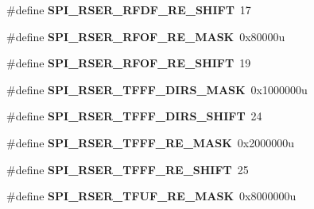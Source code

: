 \begin{DoxyCompactItemize}
\item 
\#define {\bfseries S\+P\+I\+\_\+\+R\+S\+E\+R\+\_\+\+R\+F\+D\+F\+\_\+\+R\+E\+\_\+\+S\+H\+I\+FT}~17\hypertarget{group__SPI__Register__Masks_ga39481cbcda158bbfc6640eb07d0c2276}{}\label{group__SPI__Register__Masks_ga39481cbcda158bbfc6640eb07d0c2276}

\item 
\#define {\bfseries S\+P\+I\+\_\+\+R\+S\+E\+R\+\_\+\+R\+F\+O\+F\+\_\+\+R\+E\+\_\+\+M\+A\+SK}~0x80000u\hypertarget{group__SPI__Register__Masks_ga32d8083bb571fb12a424b1803c596f47}{}\label{group__SPI__Register__Masks_ga32d8083bb571fb12a424b1803c596f47}

\item 
\#define {\bfseries S\+P\+I\+\_\+\+R\+S\+E\+R\+\_\+\+R\+F\+O\+F\+\_\+\+R\+E\+\_\+\+S\+H\+I\+FT}~19\hypertarget{group__SPI__Register__Masks_gab18f888cf02c471809ebc9f807711a13}{}\label{group__SPI__Register__Masks_gab18f888cf02c471809ebc9f807711a13}

\item 
\#define {\bfseries S\+P\+I\+\_\+\+R\+S\+E\+R\+\_\+\+T\+F\+F\+F\+\_\+\+D\+I\+R\+S\+\_\+\+M\+A\+SK}~0x1000000u\hypertarget{group__SPI__Register__Masks_ga01228112dcc4440aa1678eb55b97306e}{}\label{group__SPI__Register__Masks_ga01228112dcc4440aa1678eb55b97306e}

\item 
\#define {\bfseries S\+P\+I\+\_\+\+R\+S\+E\+R\+\_\+\+T\+F\+F\+F\+\_\+\+D\+I\+R\+S\+\_\+\+S\+H\+I\+FT}~24\hypertarget{group__SPI__Register__Masks_ga9f1684fdb2e7f9e9adb7afd07a3278da}{}\label{group__SPI__Register__Masks_ga9f1684fdb2e7f9e9adb7afd07a3278da}

\item 
\#define {\bfseries S\+P\+I\+\_\+\+R\+S\+E\+R\+\_\+\+T\+F\+F\+F\+\_\+\+R\+E\+\_\+\+M\+A\+SK}~0x2000000u\hypertarget{group__SPI__Register__Masks_ga1bb1c8b3d77e69e8ea3197b2a26392cb}{}\label{group__SPI__Register__Masks_ga1bb1c8b3d77e69e8ea3197b2a26392cb}

\item 
\#define {\bfseries S\+P\+I\+\_\+\+R\+S\+E\+R\+\_\+\+T\+F\+F\+F\+\_\+\+R\+E\+\_\+\+S\+H\+I\+FT}~25\hypertarget{group__SPI__Register__Masks_ga6b7e6d97146fb2244a8b1fb870cf980b}{}\label{group__SPI__Register__Masks_ga6b7e6d97146fb2244a8b1fb870cf980b}

\item 
\#define {\bfseries S\+P\+I\+\_\+\+R\+S\+E\+R\+\_\+\+T\+F\+U\+F\+\_\+\+R\+E\+\_\+\+M\+A\+SK}~0x8000000u\hypertarget{group__SPI__Register__Masks_ga245d7987838cad9b4392b051fbd6fb06}{}\label{group__SPI__Register__Masks_ga245d7987838cad9b4392b051fbd6fb06}


\end{DoxyCompactItemize}
